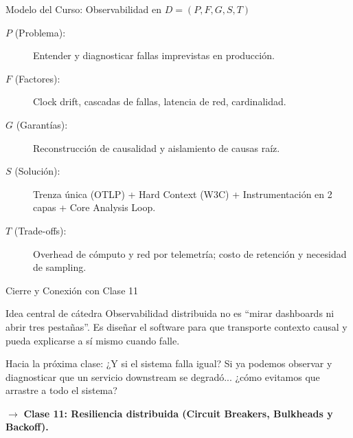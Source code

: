 \documentclass[institutional,screen,none]{../cls/ua-engineering-v6-beamer}
\begin{document}
\begin{frame}{Modelo del Curso: Observabilidad en $D = (P, F, G, S, T)$}
\begin{description}
\item[$P$ (Problema):] Entender y diagnosticar fallas imprevistas en producción.
\item[$F$ (Factores):] Clock drift, cascadas de fallas, latencia de red, cardinalidad.
\item[$G$ (Garantías):] Reconstrucción de causalidad y aislamiento de causas raíz.
\item[$S$ (Solución):] Trenza única (OTLP) + Hard Context (W3C) + Instrumentación en 2 capas + Core Analysis Loop.
\item[$T$ (Trade-offs):] Overhead de cómputo y red por telemetría; costo de retención y necesidad de sampling.
\end{description}
\end{frame}

\begin{frame}{Cierre y Conexión con Clase 11}
\begin{block}{Idea central de cátedra}
Observabilidad distribuida no es ``mirar dashboards ni abrir tres pestañas''. Es diseñar el software para que transporte contexto causal y pueda explicarse a sí mismo cuando falle.
\end{block}

\pause

\begin{alertblock}{Hacia la próxima clase: ¿Y si el sistema falla igual?}
Si ya podemos observar y diagnosticar que un servicio downstream se degradó... ¿cómo evitamos que arrastre a todo el sistema?
\end{alertblock}
$\rightarrow$ \textbf{Clase 11: Resiliencia distribuida (Circuit Breakers, Bulkheads y Backoff).}
\end{frame}
\end{document}
